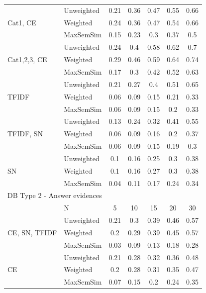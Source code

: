 \documentclass[conference]{IEEEtran}
\begin{document}
\begin{table}[!h]
\begin{tabular}{l||l|ccccc}
		\multirow{3}{*}{Cat1, CE} & Unweighted & 0.21 & 0.36 & 0.47 & 0.55 & 0.66\\
		 & Weighted & 0.24 & 0.36 & 0.47 & 0.54 & 0.66\\
		 & MaxSemSim & 0.15 & 0.23 & 0.3 & 0.37 & 0.5\\ 
		\hline
		
		\multirow{3}{*}{Cat1,2,3, CE} & Unweighted & 0.24 & 0.4 & 0.58 & 0.62 & 0.7\\
		 & Weighted & 0.29 & 0.46 & 0.59 & 0.64 & 0.74\\
		 & MaxSemSim & 0.17 & 0.3 & 0.42 & 0.52 & 0.63\\ 
		\hline
		
		\multirow{3}{*}{TFIDF} & Unweighted & 0.21 & 0.27 & 0.4 & 0.51 & 0.65\\
		 & Weighted & 0.06 & 0.09 & 0.15 & 0.21 & 0.33\\
		 & MaxSemSim & 0.06 & 0.09 & 0.15 & 0.2 & 0.33\\ 
		\hline
		
		\multirow{3}{*}{TFIDF, SN} & Unweighted & 0.13 & 0.24 & 0.32 & 0.41 & 0.55\\
		 & Weighted & 0.06 & 0.09 & 0.16 & 0.2 & 0.37\\
		 & MaxSemSim & 0.06 & 0.09 & 0.15 & 0.19 & 0.3\\ 
		\hline
		
		\multirow{3}{*}{SN} & Unweighted & 0.1 & 0.16 & 0.25 & 0.3 & 0.38\\
		 & Weighted & 0.1 & 0.16 & 0.27 & 0.3 & 0.38\\
		 & MaxSemSim & 0.04 & 0.11 & 0.17 & 0.24 & 0.34\\ 
		\hline		

		\multicolumn{7}{l}{DB Type 2 - Answer evidences}\\\hline\hline
		& N & 5 & 10 & 15 & 20 & 30\\\hline
		\hline
		
		\multirow{3}{*}{CE, SN, TFIDF} & Unweighted & 0.21 & 0.3 & 0.39 & 0.46 & 0.57\\
		 & Weighted & 0.2 & 0.29 & 0.39 & 0.45 & 0.57\\
		 & MaxSemSim & 0.03 & 0.09 & 0.13 & 0.18 & 0.28\\ 
		\hline
		
		\multirow{3}{*}{CE} & Unweighted & 0.21 & 0.28 & 0.32 & 0.36 & 0.48\\
		 & Weighted & 0.2 & 0.28 & 0.31 & 0.35 & 0.47\\
		 & MaxSemSim & 0.07 & 0.15 & 0.2 & 0.24 & 0.35\\ 
		\hline
		

\end{tabular}
\end{table}
\end{document}
